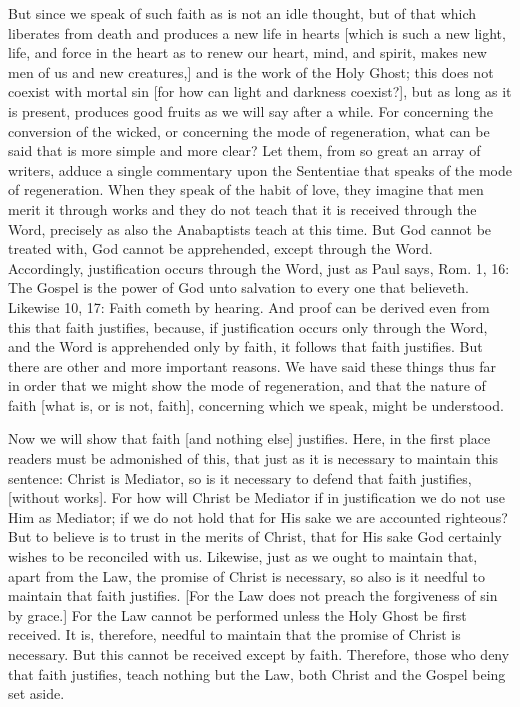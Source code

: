 But since we speak of such faith as is not an idle thought, but of
that which liberates from death and produces a new life in hearts
[which is such a new light, life, and force in the heart as to renew
our heart, mind, and spirit, makes new men of us and new creatures,]
and is the work of the Holy Ghost; this does not coexist with mortal
sin [for how can light and darkness coexist?], but as long as it is
present, produces good fruits as we will say after a while.  For
concerning the conversion of the wicked, or concerning the mode of
regeneration, what can be said that is more simple and more clear?
Let them, from so great an array of writers, adduce a single
commentary upon the Sententiae that speaks of the mode of
regeneration.  When they speak of the habit of love, they imagine
that men merit it through works and they do not teach that it is
received through the Word, precisely as also the Anabaptists teach at
this time.  But God cannot be treated with, God cannot be apprehended,
except through the Word.  Accordingly, justification occurs through
the Word, just as Paul says, Rom. 1, 16: The Gospel is the power of
God unto salvation to every one that believeth.  Likewise 10, 17:
Faith cometh by hearing.  And proof can be derived even from this
that faith justifies, because, if justification occurs only through
the Word, and the Word is apprehended only by faith, it follows that
faith justifies.  But there are other and more important reasons.  We
have said these things thus far in order that we might show the mode
of regeneration, and that the nature of faith [what is, or is not,
faith], concerning which we speak, might be understood.

Now we will show that faith [and nothing else] justifies.  Here, in
the first place readers must be admonished of this, that just as it
is necessary to maintain this sentence: Christ is Mediator, so is it
necessary to defend that faith justifies, [without works].  For how
will Christ be Mediator if in justification we do not use Him as
Mediator; if we do not hold that for His sake we are accounted
righteous?  But to believe is to trust in the merits of Christ, that
for His sake God certainly wishes to be reconciled with us.  Likewise,
just as we ought to maintain that, apart from the Law, the promise
of Christ is necessary, so also is it needful to maintain that faith
justifies.  [For the Law does not preach the forgiveness of sin by
grace.] For the Law cannot be performed unless the Holy Ghost be
first received.  It is, therefore, needful to maintain that the
promise of Christ is necessary.  But this cannot be received except
by faith.  Therefore, those who deny that faith justifies, teach
nothing but the Law, both Christ and the Gospel being set aside.


